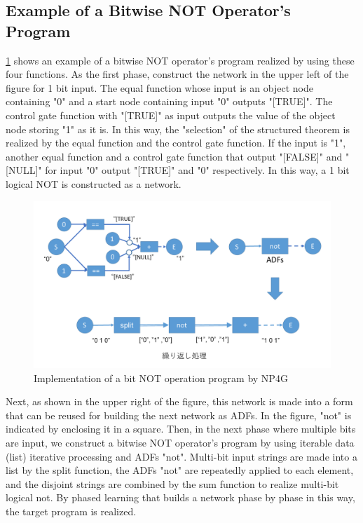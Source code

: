 \documentclass{article}
\begin{document}
\subsection {Example of a Bitwise NOT Operator's Program}
\ref{fig:bitwise_not} shows an example of a bitwise NOT operator's program realized by using these four functions.
As the first phase, construct the network in the upper left of the figure for 1 bit input.
The equal function whose input is an object node containing "0" and a start node containing input "0" outputs "[TRUE]".
The control gate function with "[TRUE]" as input outputs the value of the object node storing "1" as it is.
In this way, the "selection" of the structured theorem is realized by the equal function and the control gate function.
If the input is "1", another equal function and a control gate function that output "[FALSE]" and "[NULL]" for input "0" output "[TRUE]" and "0" respectively.
In this way, a 1 bit logical NOT is constructed as a network.





\begin{figure}[t]
    \begin{center}
        \includegraphics[width=150mm]{bitwise_not.png}
    \end{center}
    \caption{Implementation of a bit NOT operation program by NP4G}
    \label{fig:bitwise_not}
\end{figure}

Next, as shown in the upper right of the figure, this network is made into a form that can be reused for building the next network as ADFs.
In the figure, "not" is indicated by enclosing it in a square.
Then, in the next phase where multiple bits are input, we construct a bitwise NOT operator's program by using iterable data (list) iterative processing and ADFs "not".
Multi-bit input strings are made into a list by the split function, the ADFs "not" are repeatedly applied to each element, and the disjoint strings are combined by the sum function to realize multi-bit logical not.
By phased learning that builds a network phase by phase in this way, the target program is realized.
\end{document}
